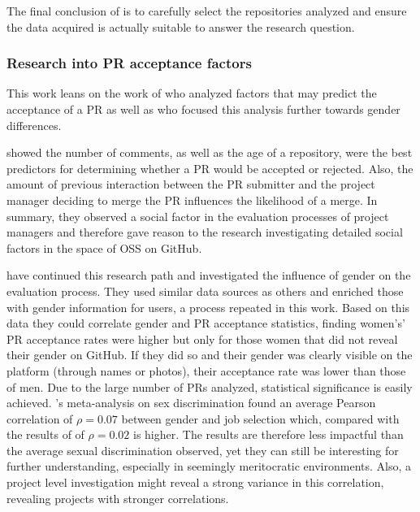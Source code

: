 The final conclusion of \citeauthor{perils-github:2015} is to carefully select the repositories analyzed and ensure the data acquired is actually suitable to answer the research question.

\subsubsection{Research into \ac{PR} acceptance factors}

This work leans on the work of \citeauthor{Tsay:2014:IST:2568225.2568315} who analyzed factors that may predict the acceptance of a \ac{PR} as well as  \citeauthor{genderdiff:2016} who focused this analysis further towards gender differences.

\citeauthor{Tsay:2014:IST:2568225.2568315} showed the number of comments, as well as the age of a repository, were the best predictors for determining whether a \ac{PR} would be accepted or rejected. Also, the amount of previous interaction between the \ac{PR} submitter and the project manager deciding to merge the \ac{PR} influences the likelihood of a merge. In summary, they observed a social factor in the evaluation processes of project managers and therefore gave reason to the research investigating detailed social factors in the space of \ac{OSS} on GitHub.

\citeauthor{genderdiff:2016} have continued this research path and investigated the influence of gender on the evaluation process. They used similar data sources as others and enriched those with gender information for users, a process repeated in this work. Based on this data they could correlate gender and \ac{PR} acceptance statistics, finding women's' \ac{PR} acceptance rates were higher but only for those women that did not reveal their gender on GitHub. If they did so and their gender was clearly visible on the platform (through names or photos), their acceptance rate was lower than those of men. Due to the large number of \ac{PR}s analyzed, statistical significance is easily achieved. \citeauthor{Davison2000225}'s meta-analysis on sex discrimination found an average Pearson correlation of $\rho = 0.07$ between gender and job selection which, compared with the results of \citeauthor{genderdiff:2016} of $\rho = 0.02$ is higher. The results are therefore less impactful than the average sexual discrimination observed, yet they can still be interesting for further understanding, especially in seemingly meritocratic environments. Also, a project level investigation might reveal a strong variance in this correlation, revealing projects with stronger correlations.




